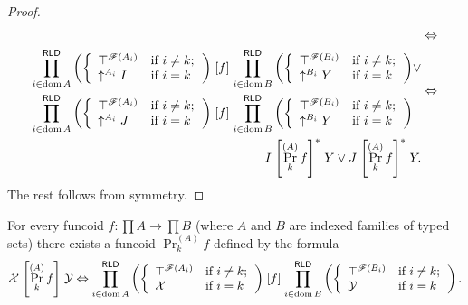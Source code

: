 \begin{proof}
\begin{align*}
\begin{aligned}
\end{aligned}
 & \Leftrightarrow\\
\begin{aligned}\prod_{i\in\operatorname{dom} A}^{\mathsf{RLD}}\left(\left\{ \begin{array}{ll}
\top^{\mathscr{F}(A_{i})} & \text{if }i\neq k;\\
\uparrow^{A_{i}}I & \text{if }i=k
\end{array}\right.\right)\mathrel{\left[f\right]}\prod_{i\in\operatorname{dom} B}^{\mathsf{RLD}}\left(\left\{ \begin{array}{ll}
\top^{\mathscr{F}(B_{i})} & \text{if }i\neq k;\\
\uparrow^{B_{i}}Y & \text{if }i=k
\end{array}\right.\right) & \lor\\
\prod_{i\in\operatorname{dom} A}^{\mathsf{RLD}}\left(\left\{ \begin{array}{ll}
\top^{\mathscr{F}(A_{i})} & \text{if }i\neq k;\\
\uparrow^{A_{i}}J & \text{if }i=k
\end{array}\right.\right)\mathrel{\left[f\right]}\prod_{i\in\operatorname{dom} B}^{\mathsf{RLD}}\left(\left\{ \begin{array}{ll}
\top^{\mathscr{F}(B_{i})} & \text{if }i\neq k;\\
\uparrow^{B_{i}}Y & \text{if }i=k
\end{array}\right.\right)
\end{aligned}
 & \Leftrightarrow\\
I\mathrel{\left[\Pr_{k}^{(A)}f\right]^{\ast}}Y\lor J\mathrel{\left[\Pr_{k}^{(A)}f\right]^{\ast}}Y.
\end{align*}
The rest follows from symmetry.\end{proof}
\begin{prop}
For every funcoid $f:\prod A\rightarrow\prod B$ (where $A$ and $B$
are indexed families of typed sets) there exists a funcoid $\Pr_{k}^{(A)}f$
defined by the formula 
\[
\mathcal{X}\mathrel{\left[\Pr_{k}^{(A)}f\right]}\mathcal{Y}\Leftrightarrow\prod_{i\in\operatorname{dom} A}^{\mathsf{RLD}}\left(\left\{ \begin{array}{ll}
\top^{\mathscr{F}(A_{i})} & \text{if }i\neq k;\\
\mathcal{X} & \text{if }i=k
\end{array}\right.\right)\mathrel{\left[f\right]}\prod_{i\in\operatorname{dom} B}^{\mathsf{RLD}}\left(\left\{ \begin{array}{ll}
\top^{\mathscr{F}(B_{i})} & \text{if }i\neq k;\\
\mathcal{Y} & \text{if }i=k
\end{array}\right.\right).
\]
\end{prop}
